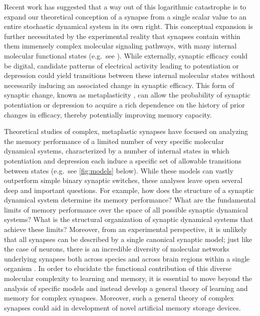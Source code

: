 \documentclass[9pt,twocolumn,twoside,lineno]{pnas-new}
\newcommand{\eg}{e.g.\ }
\begin{document}
Recent work \cite{Fusi2005cascade,Fusi2007multistate,Leibold2008serial} has suggested that a way out of this logarithmic catastrophe is to expand our theoretical conception of a synapse from a single scalar value to an entire stochastic dynamical system in its own right.
This conceptual expansion is further necessitated by the experimental reality that synapses contain within them immensely complex molecular signaling pathways, with many internal molecular functional states (\eg see \cite{Bliss1993LTP,Bredt2003AMPA,Coba2009phosphorylation}).
While externally, synaptic efficacy could be digital, candidate patterns of electrical activity leading to potentiation or depression could yield transitions between these internal molecular states without necessarily inducing an associated change in synaptic efficacy.
This form of synaptic change, known as metaplasticity \cite{Abraham1996metaplasticity,Montgomery2002765}, can allow the probability of synaptic potentiation or depression to acquire a rich dependence on the history of prior changes in efficacy, thereby potentially improving memory capacity.

Theoretical studies of complex, metaplastic synapses have focused on analyzing the memory performance of a limited number of very specific molecular dynamical systems, characterized by a number of internal states in which potentiation and depression each induce a specific set of allowable transitions between states (\eg see \cref{fig:models} below).
While these models can vastly outperform simple binary synaptic switches, these analyses leave open several deep and important questions.
For example, how does the structure of a synaptic dynamical system determine its memory performance?  What are the fundamental limits of memory performance over the space of all possible synaptic dynamical systems?
What is the structural organization of synaptic dynamical systems that achieve these limits?
Moreover, from an experimental perspective, it is unlikely that all synapses can be described by a single canonical synaptic model;  just like the case of neurons, there is an incredible diversity of molecular networks underlying synapses both across species and across brain regions within a single organism \cite{Emes2012synapserev}.
In order to elucidate the functional contribution of this diverse molecular complexity to learning and memory, it is essential to move beyond the analysis of specific models and instead develop a general theory of learning and memory for complex synapses.
Moreover, such a general theory of complex synapses could aid in development of novel artificial memory storage devices.  %
\end{document}
